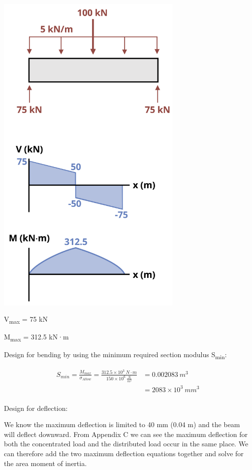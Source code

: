 \documentclass[
  letterpaper,
  DIV=11,
  numbers=noendperiod]{scrreprt}
\theoremstyle{definition}
\theoremstyle{remark}
\begin{document}
\begin{tcolorbox}
\begin{tcolorbox}
\begin{center}
\includegraphics[width=3.5625in,height=\textheight]{images/CH11 PNGs/example11.9-2.png}
\end{center}

V\textsubscript{max} = 75 kN

M\textsubscript{max} = 312.5 kN·m

Design for bending by using the minimum required section modulus
S\textsubscript{min}:

\[
\begin{aligned}
S_{min}=\frac{M_{max}}{\sigma_{Allow}}=\frac{312.5\times10^3{~N}\cdot{m}}{150 \times 10^6~\frac{N}{m^2}} & =0.002083{~m}^3 \\ 
& =2083 \times 10^3{~mm}^3 \\
\end{aligned}
\]

Design for deflection:

We know the maximum deflection is limited to 40 mm (0.04 m) and the beam
will deflect downward. From Appendix C we can see the maximum deflection
for both the concentrated load and the distributed load occur in the
same place. We can therefore add the two maximum deflection equations
together and solve for the area moment of inertia.


\end{tcolorbox}
\end{tcolorbox}
\end{document}
